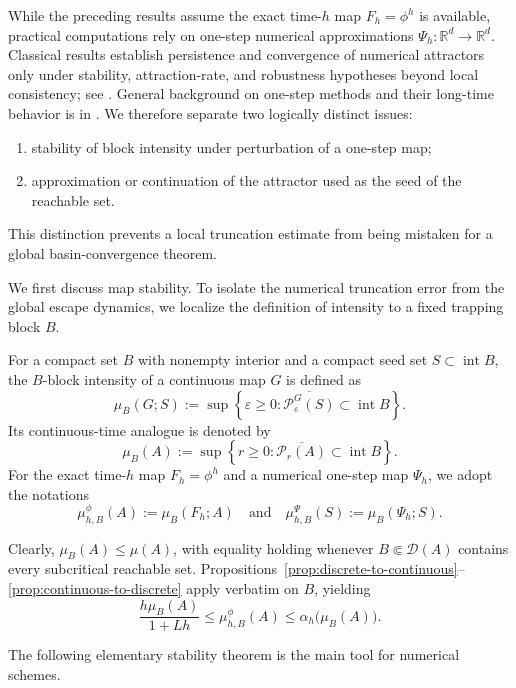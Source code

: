 \documentclass[pdflatex,sn-mathphys-num]{sn-jnl}
\numberwithin{equation}{section}
\theoremstyle{thmstyleone}%
\theoremstyle{definition}
\theoremstyle{remark}
\begin{document}
While the preceding results assume the exact time-$h$ map $F_h=\phi^h$ is available, practical computations rely on one-step numerical approximations $\Psi_h:\mathbb R^d\to\mathbb R^d$. Classical results establish persistence and convergence of numerical attractors only under stability, attraction-rate, and robustness
hypotheses beyond local consistency; see \citep{kloeden1986stable,grune2001asymptotic,garay2005attractors,stuart1998dynamical,beyn1987numerical}. General background on one-step methods and their long-time behavior is in \citep{hairer1993solving,hairer2006geometric}. We therefore separate two logically distinct issues:
\begin{enumerate}
\item stability of block intensity under perturbation of a one-step map;
\item approximation or continuation of the attractor used as the seed of the reachable set.
\end{enumerate}
This distinction prevents a local truncation estimate from being mistaken for a global basin-convergence theorem.

We first discuss map stability. To isolate the numerical truncation error from the global escape dynamics, we localize the definition of intensity to a fixed trapping block $B$. 

For a compact set $B$ with nonempty interior and a compact seed set $S \subset \operatorname{int} B$, the $B$-block intensity of a continuous map $G$ is defined as
\[
    \mu_B(G;S) := \sup\left\{\varepsilon \ge 0 : \overline{\mathcal P^G_\varepsilon(S)} \subset \operatorname{int} B\right\}.
\]
Its continuous-time analogue is denoted by
\[
    \mu_B(A) := \sup\left\{r \ge 0 : \overline{\mathcal P_r(A)} \subset \operatorname{int} B\right\}.
\]
For the exact time-$h$ map $F_h = \phi^h$ and a numerical one-step map $\Psi_h$, we adopt the notations
\[
    \mu^\phi_{h,B}(A) := \mu_B(F_h;A) \quad \text{and} \quad \mu^\Psi_{h,B}(S) := \mu_B(\Psi_h;S).
\]

Clearly, $\mu_B(A) \le \mu(A)$, with equality holding whenever $B \Subset \mathcal D(A)$ contains every subcritical reachable set. Propositions~\ref{prop:discrete-to-continuous}--\ref{prop:continuous-to-discrete} apply verbatim on $B$, yielding
\begin{equation}
\label{eq:block-sampling-bounds}
    \frac{h\mu_B(A)}{1+Lh} \le \mu^\phi_{h,B}(A) \le \alpha_h\bigl(\mu_B(A)\bigr).
\end{equation}

The following elementary stability theorem is the main tool for numerical schemes.
\end{document}
